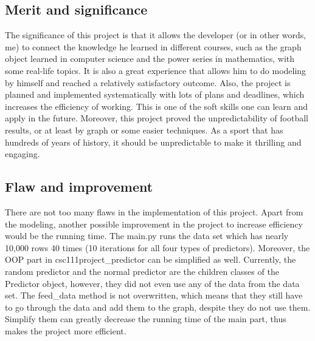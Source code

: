 \documentclass[fontsize=11pt]{article}
\begin{document}
\subsection*{Merit and significance}

The significance of this project is that it allows the developer (or in other words, me) to connect the knowledge he learned in different courses, such as the graph object learned in computer science and the power series in mathematics, with some real-life topics. It is also a great experience that allows him to do modeling by himself and reached a relatively satisfactory outcome. Also, the project is planned and implemented systematically with lots of plans and deadlines, which increases the efficiency of working. This is one of the soft skills one can learn and apply in the future. Moreover, this project proved the unpredictability of football results, or at least by graph or some easier techniques. As a sport that has hundreds of years of history, it should be unpredictable to make it thrilling and engaging. 

\subsection*{Flaw and improvement}

There are not too many flaws in the implementation of this project. Apart from the modeling, another possible improvement in the project to increase efficiency would be the running time. The main.py runs the data set which has nearly 10,000 rows 40 times (10 iterations for all four types of predictors). Moreover, the OOP part in csc111project\_predictor can be simplified as well. Currently, the random predictor and the normal predictor are the children classes of the Predictor object, however, they did not even use any of the data from the data set. The feed\_data method is not overwritten, which means that they still have to go through the data and add them to the graph, despite they do not use them. Simplify them can greatly decrease the running time of the main part, thus makes the project more efficient.
\end{document}
